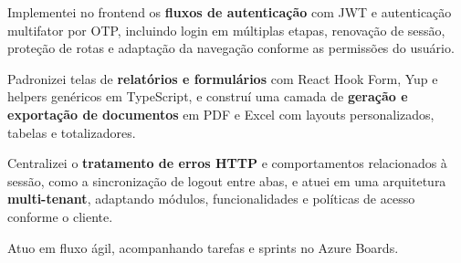 \begin{cventries}
{\begin{cvitems}
        \item {Implementei no frontend os \textbf{fluxos de autenticação} com JWT e autenticação multifator por OTP, incluindo login em múltiplas etapas, renovação de sessão, proteção de rotas e adaptação da navegação conforme as permissões do usuário.}
        \item {Padronizei telas de \textbf{relatórios e formulários} com React Hook Form, Yup e helpers genéricos em TypeScript, e construí uma camada de \textbf{geração e exportação de documentos} em PDF e Excel com layouts personalizados, tabelas e totalizadores.}
        \item {Centralizei o \textbf{tratamento de erros HTTP} e comportamentos relacionados à sessão, como a sincronização de logout entre abas, e atuei em uma arquitetura \textbf{multi-tenant}, adaptando módulos, funcionalidades e políticas de acesso conforme o cliente.}
        \item {Atuo em fluxo ágil, acompanhando tarefas e sprints no Azure Boards.}
      \end{cvitems}
    }


\end{cventries}
